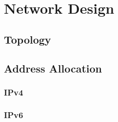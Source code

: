 \chapter{Network Design}
\section{Topology}
\section{Address Allocation}
\subsection{IPv4}
\subsection{IPv6}